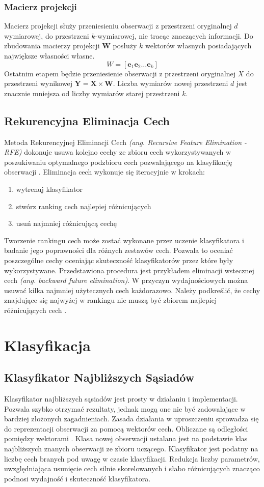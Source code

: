 \documentclass[a4paper,12pt,twoside,openany]{report}
\newcommand{\ang}[1]{\textit{(ang. #1)}}
\renewcommand{\vec}[1]{\bm{#1}}
\begin{document}
\subsubsection{Macierz projekcji}
Macierz projekcji służy przeniesieniu obserwacji z przestrzeni oryginalnej $d$ wymiarowej,
do przestrzeni $k$-wymiarowej, nie tracąc znaczących informacji.
Do zbudowania macierzy projekcji $\vec W$ posłuży $k$ wektorów własnych posiadających największe własności własne.
\begin{equation}
	W = [\vec e_1 \vec e_2 \dots \vec e_k]
\end{equation}
Ostatnim etapem będzie przeniesienie obserwacji z przestrzeni oryginalnej $X$ do przestrzeni wynikowej $\vec Y = \vec X \times \vec W$.
Liczba wymiarów nowej przestrzeni $d$ jest znacznie mniejsza od liczby wymiarów starej przestrzeni $k$.
\subsection{Rekurencyjna Eliminacja Cech}\label{sec:rfe}
Metoda Rekurencyjnej Eliminacji Cech \ang{Recursive Feature Elimination - RFE}
dokonuje usuwa kolejno cechy ze zbioru cech wykorzystywanych
w poszukiwaniu optymalnego podzbioru cech pozwalającego na klasyfikację obserwacji \cite{Guyon2002}.
Eliminacja cech wykonuje się iteracyjnie w krokach:
\begin{enumerate}
	\item wytrenuj klasyfikator
	\item stwórz ranking cech najlepiej różnicujących
	\item usuń najmniej różnicującą cechę
\end{enumerate}
Tworzenie rankingu cech może zostać wykonane przez uczenie klasyfikatora i badanie jego poprawności dla różnych zestawów cech.
Pozwala to oceniać poszczególne cechy oceniając skuteczność klasyfikatorów przez które były wykorzystywane.
Przedstawiona procedura jest przykładem eliminacji wstecznej cech \ang{backward future elimination}.
W przyczyn wydajnościowych można usuwać kilka najmniej użytecznych cech każdorazowo.
Należy podkreślić, że cechy znajdujące się najwyżej w rankingu nie muszą być zbiorem najlepiej różnicujących cech \cite{Guyon2002}.
\section{Klasyfikacja}
\subsection{Klasyfikator Najbliższych Sąsiadów}
Klasyfikator najbliższych sąsiadów jest prosty w działaniu i implementacji.
Pozwala szybko otrzymać rezultaty, jednak mogą one nie być zadowalające w bardziej złożonych zagadnieniach.
Zasada działania w uproszczeniu sprowadza się do reprezentacji obserwacji za pomocą wektorów cech.
Obliczane są odległości pomiędzy wektorami \cite{Du2013}.
Klasa nowej obserwacji ustalana jest na podstawie klas najbliższych znanych obserwacji ze zbioru uczącego.
Klasyfikator jest podatny na liczbę cech branych pod uwagę w czasie klasyfikacji.
Redukcja liczby parametrów, uwzględniająca usunięcie cech silnie skorelowanych i słabo różnicujących znacząco podnosi wydajność i skuteczność klasyfikatora.
\end{document}
